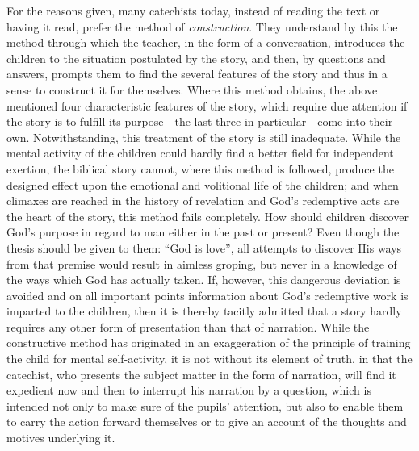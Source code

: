 For the reasons given, many catechists today, instead of reading the text or having it read, prefer the method of \emph{construction}. They understand by this the method through which the teacher, in the form of a conversation, introduces the children to the situation postulated by the story, and then, by questions and answers, prompts them to find the several features of the story and thus in a sense to construct it for themselves. Where this method obtains, the above mentioned four characteristic features of the story, which require due attention if the story is to fulfill its purpose—the last three in particular—come into their own. Notwithstanding, this treatment of the story is still inadequate. While the mental activity of the children could hardly find a better field for independent exertion, the biblical story cannot, where this method is followed, produce the designed effect upon the emotional and volitional life of the children; and when climaxes are reached in the history of revelation and God’s redemptive acts are the heart of the story, this method fails completely. How should children discover God’s purpose in regard to man either in the past or present? Even though the thesis should be given to them: “God is love”, all attempts to discover His ways from that premise would result in aimless groping, but never in a knowledge of the ways which God has actually taken. If, however, this dangerous deviation is avoided and on all important points information about God’s redemptive work is imparted to
the children, then it is thereby tacitly admitted that a story hardly requires any other form of presentation than that of narration. While the constructive method has originated in an exaggeration of the principle of training the child for mental self-activity, it is not without its element of truth, in that the catechist, who presents the subject matter in the form of narration, will find it expedient now and then to interrupt his narration by a question, which is intended not only to make sure of the pupils’ attention, but also to enable them to carry the action forward themselves or to give an account of the thoughts and motives underlying it.

